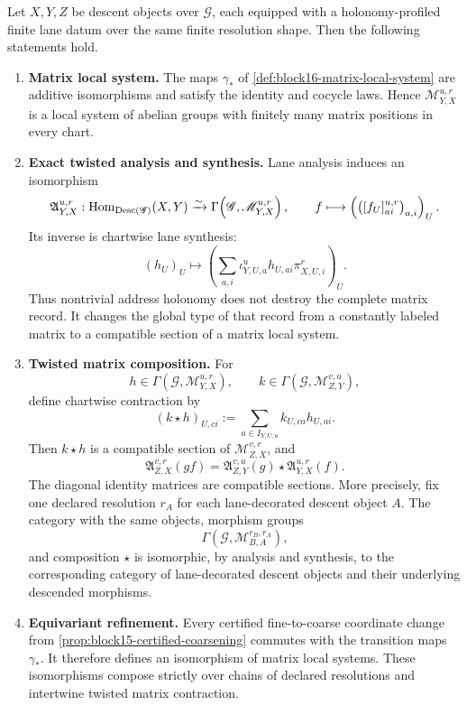 \begin{theorem}
\label{thm:block16-holonomy-twisted-lane-transport}
Let \(X,Y,Z\) be descent objects over \(\mathscr G\), each equipped with a
holonomy-profiled finite lane datum over the same finite resolution shape.
Then the following statements hold.

\begin{enumerate}[label=\textup{(H\arabic*)}]
\item \textbf{Matrix local system.}
The maps \(\gamma_*\) of
\cref{def:block16-matrix-local-system} are additive isomorphisms and satisfy
the identity and cocycle laws.  Hence
\(\mathscr M^{u,r}_{Y,X}\) is a local system of abelian groups with finitely many matrix positions in every chart.

\item \textbf{Exact twisted analysis and synthesis.}
Lane analysis induces an isomorphism
\[
 \mathfrak A^{u,r}_{Y,X}:
 \operatorname{Hom}_{\operatorname{Desc}(\mathscr G)}(X,Y)
 \xrightarrow{\sim}
 \Gamma\!\left(\mathscr G,\mathscr M^{u,r}_{Y,X}\right),
 \qquad
 f\longmapsto
 \left(\bigl([f_U]^{u,r}_{ai}\bigr)_{a,i}\right)_U.
\]
Its inverse is chartwise lane synthesis:
\[
 (h_U)_U\longmapsto
 \left(
 \sum_{a,i}
 \iota^u_{Y,U,a}h_{U,ai}\pi^r_{X,U,i}
 \right)_U.
\]
Thus nontrivial address holonomy does not destroy the complete matrix record.
It changes the global type of that record from a constantly labeled matrix to
a compatible section of a matrix local system.

\item \textbf{Twisted matrix composition.}
For
\[
 h\in\Gamma(\mathscr G,\mathscr M^{u,r}_{Y,X}),
 \qquad
 k\in\Gamma(\mathscr G,\mathscr M^{v,u}_{Z,Y}),
\]
define chartwise contraction by
\[
 (k\star h)_{U,ci}
 :=
 \sum_{a\in I_{Y,U,u}}k_{U,ca}h_{U,ai}.
\]
Then \(k\star h\) is a compatible section of
\(\mathscr M^{v,r}_{Z,X}\), and
\[
 \mathfrak A^{v,r}_{Z,X}(gf)
 =
 \mathfrak A^{v,u}_{Z,Y}(g)
 \star
 \mathfrak A^{u,r}_{Y,X}(f).
\]
The diagonal identity matrices are compatible sections.  More precisely, fix
one declared resolution \(r_A\) for each lane-decorated descent object \(A\).
The category with the same objects, morphism groups
\[
 \Gamma\!\left(\mathscr G,
 \mathscr M^{r_B,r_A}_{B,A}\right),
\]
and composition \(\star\) is isomorphic, by analysis and synthesis, to the
corresponding category of lane-decorated descent objects and their underlying
descended morphisms.

\item \textbf{Equivariant refinement.}
Every certified fine-to-coarse coordinate change from
\cref{prop:block15-certified-coarsening} commutes with the transition maps
\(\gamma_*\).  It therefore defines an isomorphism of matrix local systems.
These isomorphisms compose strictly over chains of declared resolutions and
intertwine twisted matrix contraction.


\end{enumerate}
\end{theorem}
